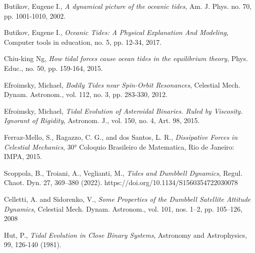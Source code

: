 \documentclass[11pt, oneside,reqno]{amsart}
\begin{document}
\begin{thebibliography}{9}

Butikov, Eugene I.,
\emph{A dynamical picture of the oceanic tides},
Am. J. Phys. no. 70, pp. 1001-1010, 2002.

Butikov, Eugene I.,
\emph{Oceanic Tides: A Physical Explanation And Modeling},
Computer tools in education, no. 5, pp. 12-34, 2017.

Chiu-king Ng, 
\emph{How tidal forces cause ocean tides in the equilibrium theory},
Phys. Educ., no. 50, pp. 159-164, 2015.

Efroimsky, Michael,
\emph{Bodily Tides near Spin-Orbit Resonances},
Celestial Mech. Dynam. Astronom., vol. 112, no. 3, pp. 283-330, 2012.

Efroimsky, Michael,
\emph{Tidal Evolution of Asteroidal Binaries. Ruled by Viscosity. Ignorant of Rigidity},
Astronom. J., vol. 150, no. 4, Art. 98, 2015.

Ferraz-Mello, S., Ragazzo, C. G., and dos Santos, L. R., 
\emph{Dissipative Forces in Celestial Mechanics},
30° Coloquio Brasileiro de Matematica, Rio de Janeiro: IMPA, 2015.

Scoppola, B., Troiani, A., Veglianti, M.,
\emph{Tides and Dumbbell Dynamics},
Regul. Chaot. Dyn. 27, 369–380 (2022).
https://doi.org/10.1134/S1560354722030078

Celletti, A. and Sidorenko, V.,
\emph{Some Properties of the Dumbbell Satellite Attitude Dynamics},
Celestial Mech. Dynam. Astronom., vol. 101, nos. 1–2, pp. 105–126, 2008

Hut, P., 
\emph{Tidal Evolution in Close Binary Systems},
Astronomy and Astrophysics, 99, 126-140 (1981).  


\end{thebibliography}
\end{document}
